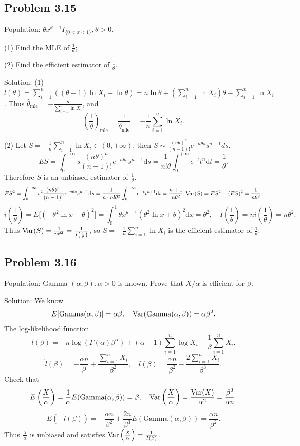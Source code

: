 \subsection*{Problem 3.15}
Population: $\theta x^{\theta-1}I_{\{0<x<1\}},\theta>0$.

(1) Find the MLE of $\frac{1}{\theta}$;

(2) Find the efficient estimator of $\frac{1}{\theta}$.

{Solution:}
(1) $l(\theta)=\sum_{i=1}^{n}\left((\theta-1)\ln X_{i}+\ln\theta\right)=n\ln\theta+\left(\sum_{i=1}^{n}\ln X_{i}\right)\theta-\sum_{i=1}^{n}\ln X_{i}$. Thus $\hat{\theta}_{\text{mle}}=-\frac{n}{\sum_{i=1}^{n}\ln X_{i}}$, and
\[
\left(\frac{1}{\hat{\theta}}\right)_{\text{mle}}=\frac{1}{\hat{\theta}_{\text{mle}}}=-\frac{1}{n}\sum_{i=1}^{n}\ln X_{i}.
\]

(2) Let $S=-\frac{1}{n}\sum_{i=1}^{n}\ln X_{i}\in\left(0,+\infty\right)$, then $S\sim\frac{(n\theta)^{n}}{(n-1)!}e^{-n\theta s}s^{n-1}ds$.
\[
ES=\int_{0}^{+\infty}s\frac{(n\theta)^{n}}{(n-1)!}e^{-n\theta s}s^{n-1}\mathrm{d}s=\frac{1}{n!\theta}\int_{0}^{+\infty}e^{-t}t^{n}\mathrm{d}t=\frac{1}{\theta}.
\]
Therefore $S$ is an unbiased estimator of $\frac{1}{\theta}$.
\[
ES^{2}=\int_{0}^{+\infty}s^{2}\frac{(n\theta)^{n}}{(n-1)!}e^{-n\theta s}s^{n-1}\mathrm{d}s=\frac{1}{n\cdot n!\theta^{2}}\int_{0}^{+\infty}e^{-t}t^{n+1}\mathrm{d}t=\frac{n+1}{n\theta^{2}},\operatorname{Var}(S)=ES^{2}-(ES)^{2}=\frac{1}{n\theta^{2}}.
\]
\[
i\left(\frac{1}{\theta}\right)=E\Big[\left(-\theta^{2}\ln x-\theta\right)^{2}\Big]=\int_{0}^{1}\theta x^{\theta-1}\left(\theta^{2}\ln x+\theta\right)^{2}\mathrm{d}x=\theta^{2},\quad I\left(\frac{1}{\theta}\right)=ni\left(\frac{1}{\theta}\right)=n\theta^{2}.
\]
Thus $\operatorname{Var}(S)=\frac{1}{n\theta^{2}}=\frac{1}{I\left(\frac{1}{\theta}\right)}$, so $S=-\frac{1}{n}\sum_{i=1}^{n}\ln X_{i}$ is the efficient estimator of $\frac{1}{\theta}$.

\subsection*{Problem 3.16}
Population: Gamma $(\alpha,\beta),\alpha>0$ is known. Prove that $\bar{X}/\alpha$ is efficient for $\beta$.

{Solution:}
We know
\[
E[\text{Gamma}(\alpha,\beta)]=\alpha\beta,\quad \operatorname{Var}(\text{Gamma}(\alpha,\beta))=\alpha\beta^{2}.
\]
The log-likelihood function
\[
l(\beta)=-n\log\left(\Gamma(\alpha)\beta^{\alpha}\right)+(\alpha-1)\sum_{i=1}^{n}\log X_{i}-\frac{1}{\beta}\sum_{i=1}^{n}X_{i}.
\]
\[
\dot{l}(\beta)=-\frac{\alpha n}{\beta}+\frac{\sum_{i=1}^{n}X_{i}}{\beta^{2}},\quad \ddot{l}(\beta)=\frac{\alpha n}{\beta^{2}}-\frac{2\sum_{i=1}^{n}X_{i}}{\beta^{3}}.
\]
Check that
\[
E\left(\frac{\bar{X}}{\alpha}\right)=\frac{1}{\alpha}E(\text{Gamma}(\alpha,\beta))=\beta,\quad \operatorname{Var}\left(\frac{\bar{X}}{\alpha}\right)=\frac{\operatorname{Var}(\bar{X})}{\alpha^{2}}=\frac{\beta^{2}}{\alpha n}.
\]
\[
E(-\ddot{l}(\beta))=-\frac{\alpha n}{\beta^{2}}+\frac{2n}{\beta^{3}}E(\text{Gamma}(\alpha,\beta))=\frac{\alpha n}{\beta^{2}}.
\]
Thus $\frac{\bar{X}}{\alpha}$ is unbiased and satisfies $\operatorname{Var}\left(\frac{\bar{X}}{\alpha}\right)=\frac{1}{I(\beta)}$.

